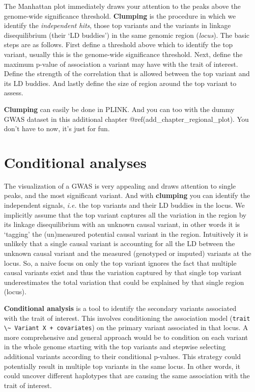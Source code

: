 \documentclass[
]{book}
\newcommand{\passthrough}[1]{#1}
\begin{document}
The Manhattan plot immediately draws your attention to the peaks above the genome-wide significance threshold. \textbf{Clumping} is the procedure in which we identify the \emph{independent hits}, those top variants and the variants in linkage disequilibrium (their `LD buddies') in the same genomic region (\emph{locus}). The basic steps are as follows. First define a threshold above which to identify the top variant, usually this is the genome-wide significance threshold. Next, define the maximum p-value of association a variant may have with the trait of interest. Define the strength of the correlation that is allowed between the top variant and its LD buddies. And lastly define the size of region around the top variant to assess.

\textbf{Clumping} can easily be done in PLINK. And you can too with the dummy GWAS dataset in this additional chapter @ref(add\_chapter\_regional\_plot). You don't have to now, it's just for fun.

\hypertarget{conditional-analyses}{%
\section{Conditional analyses}\label{conditional-analyses}}

The visualization of a GWAS is very appealing and draws attention to single peaks, and the most significant variant. And with \textbf{clumping} you can identify the independent signals, \emph{i.e.} the top variants and their LD buddies in the locus. We implicitly assume that the top variant captures all the variation in the region by its linkage disequilibrium with an unknown causal variant, in other words it is `tagging' the (un)measured potential causal variant in the region. Intuitively it is unlikely that a single causal variant is accounting for all the LD between the unknown causal variant and the measured (genotyped or imputed) variants at the locus. So, a naive focus on only the top variant ignores the fact that multiple causal variants exist and thus the variation captured by that single top variant underestimates the total variation that could be explained by that single region (locus).

\textbf{Conditional analysis} is a tool to identify the secondary variants associated with the trait of interest. This involves conditioning the association model (\passthrough{\lstinline!trait \~ Variant X + covariates!}) on the primary variant associated in that locus. A more comprehensive and general approach would be to condition on each variant in the whole genome starting with the top variants and stepwise selecting additional variants according to their conditional p-values. This strategy could potentially result in multiple top variants in the same locus. In other words, it could uncover different haplotypes that are causing the same association with the trait of interest.
\end{document}
